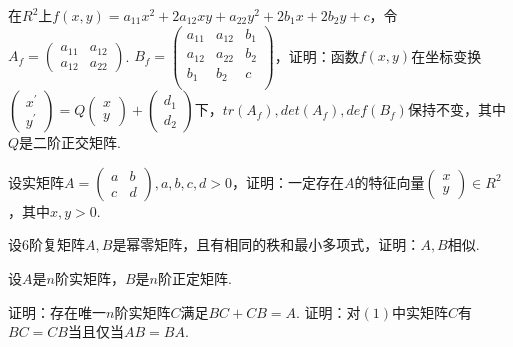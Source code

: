 \documentclass[windows]{BHCexam}
\begin{document}
\begin{groups}
        \begin{questions}[s]
            \question[20]
            在$R^2$上$f(x,y)=a_{11}x^2+2a_{12}xy+a_{22}y^2+2b_1x+2b_2y+c$，令$A_f=\begin{pmatrix}
                a_{11} & a_{12} \\
                a_{12} & a_{22}
            \end{pmatrix}$. $B_f=\begin{pmatrix}
                a_{11} & a_{12} & b_1 \\
                a_{12} & a_{22} & b_2 \\
                b_{1} & b_{2} & c \\
            \end{pmatrix}$，证明：函数$f(x,y)$在坐标变换$\begin{pmatrix}
                x^\prime \\
                y ^\prime
            \end{pmatrix}= Q \begin{pmatrix}
                x \\ y
            \end{pmatrix}+ \begin{pmatrix}
                d_1 \\ d_2
            \end{pmatrix}下$，$tr(A_f),det(A_f),def(B_f)$保持不变，其中$Q$是二阶正交矩阵.
        \end{questions}

        \begin{questions}[s]
            \question[20]
            设实矩阵$A=\begin{pmatrix}
                a & b \\ c & d
            \end{pmatrix},a,b,c,d>0$，证明：一定存在$A$的特征向量$\begin{pmatrix}
                x \\ y
            \end{pmatrix} \in R^2$，其中$x,y>0$.
        \end{questions}

        \begin{questions}[s]
            \question[15]
            设$6$阶复矩阵$A,B$是幂零矩阵，且有相同的秩和最小多项式，证明：$A,B$相似.
        \end{questions}

        \begin{questions}[s]
            \question[20]
            设$A$是$n$阶实矩阵，$B$是$n$阶正定矩阵.
            \begin{subquestions}
                \subquestion 证明：存在唯一$n$阶实矩阵$C$满足$BC+CB=A$.
                \subquestion 证明：对$(1)$中实矩阵$C$有$BC=CB$当且仅当$AB=BA$.
            \end{subquestions}
        \end{questions}
	\end{groups}
\end{document}

